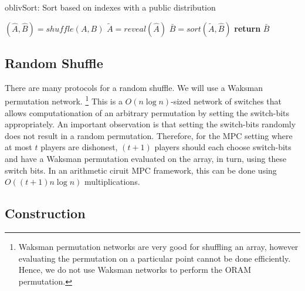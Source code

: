 \begin{algorithm}
\caption{oblivSort: Sort based on indexes with a public distribution}
\label{fig:OblivSort}
\begin{algorithmic}[0]

\State $(\hat{A} , \hat{B}) = shuffle(A, B)$
\State $\tilde{A} = reveal(\hat{A})$
\State $\bar{B} = sort(\tilde{A}, \hat{B})$
\State \textbf{return} $\bar{B}$
\EndProcedure

\end{algorithmic}
\end{algorithm}

\subsection{Random Shuffle}

There are many protocols for a random shuffle.
We will use a Waksman permutation network.
\footnote{Waksman permutation networks are very good for shuffling an array,
however evaluating the permutation on a particular point cannot be done
efficiently. Hence, we do not use Waksman networks to perform the ORAM permutation.}
This is a $O(n \log{n})$-sized network of switches that allows computationation
of an arbitrary permutation by setting the switch-bits appropriately.
An important observation is that setting the switch-bits randomly
does not result in a random permutation.
Therefore, for the MPC setting where at most $t$ players are dishonest,
$(t+1)$ players should each choose switch-bits and have a Waksman permutation
evaluated on the array, in turn, using these switch bits.  
In an arithmetic ciruit MPC framework, this can be done using $O( (t+1) n \log{n})$ multiplications.


\subsection{Construction}

